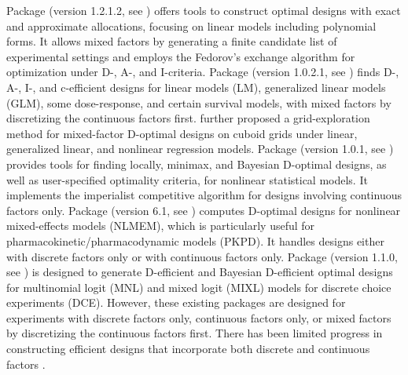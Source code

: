 Package  (version 1.2.1.2, see \cite{wheeler2025package}) offers tools to construct optimal designs with exact and approximate allocations, focusing on linear models including polynomial forms. It allows mixed factors by generating a finite candidate list of experimental settings and employs the Fedorov's exchange algorithm \citep{fedorov1972} for optimization under D-, A-, and I-criteria. Package  (version 1.0.2.1, see \cite{harman2025package, harman2020randomized}) finds D-, A-, I-, and c-efficient designs for linear models (LM), generalized linear models (GLM), some dose-response, and certain survival models, with mixed factors by discretizing the continuous factors first. \cite{harman2021optimal} further proposed a grid-exploration method for mixed-factor D-optimal designs on cuboid grids under linear, generalized linear, and nonlinear regression models. Package  (version 1.0.1, see \cite{masoudi2022package}) provides tools for finding locally, minimax, and Bayesian D-optimal designs, as well as user-specified optimality criteria, for nonlinear statistical models. It implements the imperialist competitive algorithm \citep{masoudi2022icaod} for designs involving continuous factors only.
Package  (version 6.1, see \cite{mentre2024package, dumont2018pfim}) computes D-optimal designs for nonlinear mixed-effects models (NLMEM), which is particularly useful for pharmacokinetic/pharmacodynamic models (PKPD). It handles designs either with discrete factors only or with continuous factors only. 
Package  (version 1.1.0, see \cite{traets2025package, traets2020generating}) is designed to generate D-efficient and Bayesian D-efficient optimal designs for multinomial logit (MNL) and mixed logit (MIXL) models for discrete choice experiments (DCE). However, these existing packages are designed for experiments with discrete factors only, continuous factors only, or mixed factors by discretizing the continuous factors first. There has been limited progress in constructing efficient designs that incorporate both discrete and continuous factors \citep{huang2024forlion}. 

